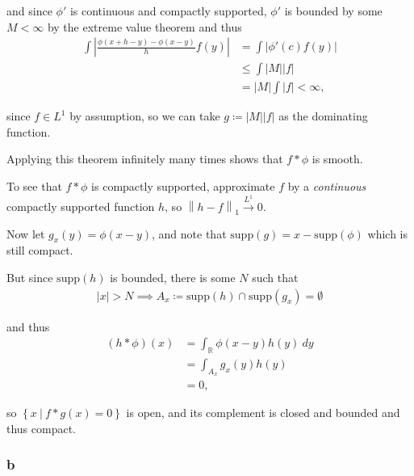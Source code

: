 \begin{solution}
and since \(\phi'\) is continuous and compactly supported, \(\phi'\) is
bounded by some \(M < \infty\) by the extreme value theorem and thus
\begin{align*}
\int {\left\lvert {\frac{\phi(x + h - y) - \phi(x - y)}{h} f(y)} \right\rvert} 
&= \int {\left\lvert {\phi'(c) f(y)} \right\rvert} \\
&\leq \int {\left\lvert {M} \right\rvert}{\left\lvert {f} \right\rvert} \\
&= {\left\lvert {M} \right\rvert} \int {\left\lvert {f} \right\rvert} < \infty
,\end{align*}

since \(f\in L^1\) by assumption, so we can take
\(g\coloneqq{\left\lvert {M} \right\rvert} {\left\lvert {f} \right\rvert}\)
as the dominating function.

Applying this theorem infinitely many times shows that \(f\ast \phi\) is
smooth.

To see that \(f\ast \phi\) is compactly supported, approximate \(f\) by
a \emph{continuous} compactly supported function \(h\), so
\({\left\lVert {h - f} \right\rVert}_1 \overset{L^1}\to 0\).

Now let \(g_x(y) = \phi(x-y)\), and note that
\(\mathrm{supp}(g) = x - \mathrm{supp}(\phi)\) which is still compact.

But since \(\mathrm{supp}(h)\) is bounded, there is some \(N\) such that
\begin{align*}
{\left\lvert {x} \right\rvert} > N \implies A_x\coloneqq\mathrm{supp}(h) \cap\mathrm{supp}(g_x) = \emptyset
\end{align*}

and thus
\begin{align*}
(h\ast \phi)(x) 
&= \int_{\mathbb{R}}\phi(x-y) h(y)~dy \\
&= \int_{A_x} g_x(y) h(y) \\
&= 0
,\end{align*}

so \(\left\{{x {~\mathrel{\Big|}~}f\ast g(x) = 0}\right\}\) is open, and
its complement is closed and bounded and thus compact.

\hypertarget{b-2}{%
\subsubsection{b}\label{b-2}}


\end{solution}
